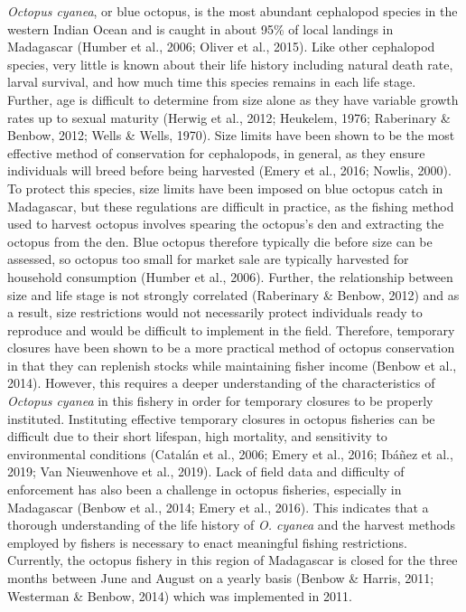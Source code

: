 \documentclass[
]{article}
\begin{document}
\emph{Octopus cyanea}, or blue octopus, is the most abundant cephalopod species in the western Indian Ocean and is caught in about 95\% of local landings in Madagascar (Humber et al., 2006; Oliver et al., 2015). Like other cephalopod species, very little is known about their life history including natural death rate, larval survival, and how much time this species remains in each life stage. Further, age is difficult to determine from size alone as they have variable growth rates up to sexual maturity (Herwig et al., 2012; Heukelem, 1976; Raberinary \& Benbow, 2012; Wells \& Wells, 1970). Size limits have been shown to be the most effective method of conservation for cephalopods, in general, as they ensure individuals will breed before being harvested (Emery et al., 2016; Nowlis, 2000). To protect this species, size limits have been imposed on blue octopus catch in Madagascar, but these regulations are difficult in practice, as the fishing method used to harvest octopus involves spearing the octopus's den and extracting the octopus from the den. Blue octopus therefore typically die before size can be assessed, so octopus too small for market sale are typically harvested for household consumption (Humber et al., 2006). Further, the relationship between size and life stage is not strongly correlated (Raberinary \& Benbow, 2012) and as a result, size restrictions would not necessarily protect individuals ready to reproduce and would be difficult to implement in the field. Therefore, temporary closures have been shown to be a more practical method of octopus conservation in that they can replenish stocks while maintaining fisher income (Benbow et al., 2014). However, this requires a deeper understanding of the characteristics of \emph{Octopus cyanea} in this fishery in order for temporary closures to be properly instituted. Instituting effective temporary closures in octopus fisheries can be difficult due to their short lifespan, high mortality, and sensitivity to environmental conditions (Catalán et al., 2006; Emery et al., 2016; Ibáñez et al., 2019; Van Nieuwenhove et al., 2019). Lack of field data and difficulty of enforcement has also been a challenge in octopus fisheries, especially in Madagascar (Benbow et al., 2014; Emery et al., 2016). This indicates that a thorough understanding of the life history of \emph{O. cyanea} and the harvest methods employed by fishers is necessary to enact meaningful fishing restrictions. Currently, the octopus fishery in this region of Madagascar is closed for the three months between June and August on a yearly basis (Benbow \& Harris, 2011; Westerman \& Benbow, 2014) which was implemented in 2011.
\end{document}
